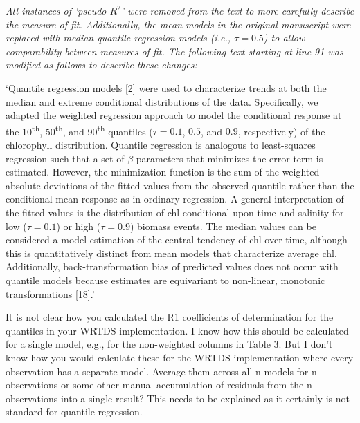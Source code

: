 \documentclass[letterpaper,12pt,oneside]{article}\usepackage[]{graphicx}\usepackage[]{color}
\begin{document}
{\it All instances of `pseudo-$R^2$' were removed from the text to more carefully describe the measure of fit.  Additionally, the mean models in the original manuscript were replaced with median quantile regression models (i.e., $\tau = 0.5$) to allow comparability between measures of fit.  The following text starting at line 91 was modified as follows to describe these changes:

`Quantile regression models [2] were used to characterize trends at both the median and extreme conditional distributions of the data.  Specifically, we adapted the weighted regression approach to model the conditional response at the 10\textsuperscript{th}, 50\textsuperscript{th}, and 90\textsuperscript{th} quantiles ($\tau=0.1$, $0.5$, and $0.9$, respectively) of the chlorophyll distribution. Quantile regression is analogous to least-squares regression such that a set of $\beta$ parameters that minimizes the error term is estimated.  However, the minimization function is the sum of the weighted absolute deviations of the fitted values from the observed quantile rather than the conditional mean response as in ordinary regression.  A general interpretation of the fitted values is the distribution of \acs{chl} conditional upon time and salinity for low ($\tau=0.1$) or high ($\tau=0.9$) biomass events.  The median values can be considered a model estimation of the central tendency of \acs{chl} over time, although this is quantitatively distinct from mean models that characterize average \acs{chl}.  Additionally, back-transformation bias of predicted values does not occur with quantile models because estimates are equivariant to non-linear, monotonic transformations [18].'
}

It is not clear how you calculated the R1 coefficients of determination for the quantiles in your WRTDS implementation.  I know how this should be calculated for a single model, e.g., for the non-weighted columns in Table 3.  But I don't know how you would calculate these for the WRTDS implementation where every observation has a separate model.  Average them across all n models for n observations or some other manual accumulation of residuals from the n observations into a single result?  This needs to be explained as it certainly is not standard for quantile regression.
\end{document}
